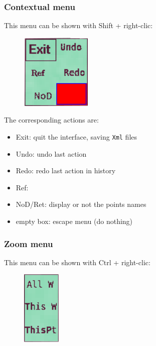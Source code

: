 \subsubsection{Contextual menu}

This menu can be shown with Shift + right-clic:

\begin{figure}[H]
\begin{center}
\includegraphics[width=95pt]{FIGS/Saisie/contextual.png}
\end{center}
\label{FIG:contextual}
\end{figure}

The corresponding actions are:

\begin{itemize}
\item Exit: quit the interface, saving {\tt Xml} files
\item Undo: undo last action
\item Redo: redo last action in history
\item Ref:
\item NoD/Ret: display or not the points names
\item empty box: escape menu (do nothing)
\end{itemize}

\subsubsection{Zoom menu}

This menu can be shown with Ctrl + right-clic:

\begin{figure}[H]
\begin{center}
\includegraphics[width=52pt]{FIGS/Saisie/zoom.png}
\end{center}
\label{FIG:zoom}
\end{figure}

